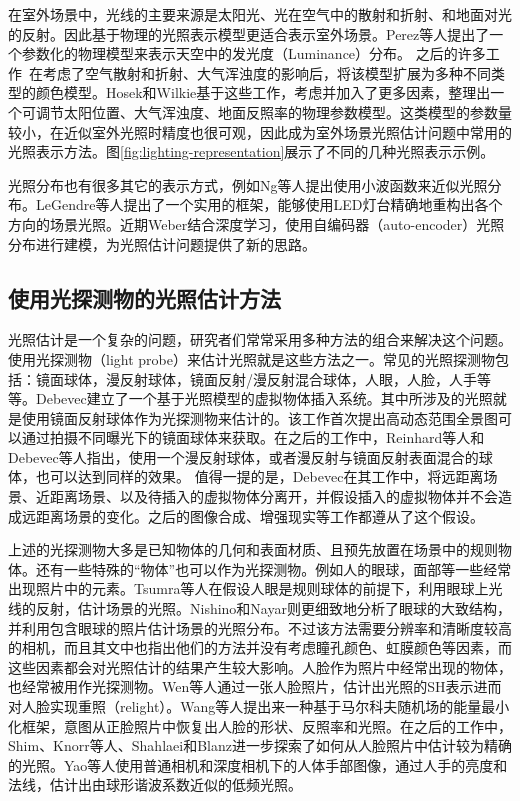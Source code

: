 在室外场景中，光线的主要来源是太阳光、光在空气中的散射和折射、和地面对光的反射。因此基于物理的光照表示模型更适合表示室外场景。Perez等人\cite{perez1993all}提出了一个参数化的物理模型来表示天空中的发光度（Luminance）分布。
之后的许多工作~\cite{nishita1996display, sirai1993display, preetham1999practical,raab2008unbiased}在考虑了空气散射和折射、大气浑浊度的影响后，将该模型扩展为多种不同类型的颜色模型。Hosek和Wilkie\cite{hosek2012analytic, hovsekhovsek2013adding}基于这些工作，考虑并加入了更多因素，整理出一个可调节太阳位置、大气浑浊度、地面反照率的物理参数模型。这类模型的参数量较小，在近似室外光照时精度也很可观，因此成为室外场景光照估计问题中常用的光照表示方法。图\ref{fig:lighting-representation}展示了不同的几种光照表示示例。

光照分布也有很多其它的表示方式，例如Ng等人\cite{ng2003all}提出使用小波函数来近似光照分布。LeGendre等人\cite{legendre2016practical}提出了一个实用的框架，能够使用LED灯台精确地重构出各个方向的场景光照。近期Weber\cite{weber2018learning}结合深度学习，使用自编码器（auto-encoder）光照分布进行建模，为光照估计问题提供了新的思路。

\subsection{使用光探测物的光照估计方法} 
光照估计是一个复杂的问题，研究者们常常采用多种方法的组合来解决这个问题。使用光探测物（light probe）来估计光照就是这些方法之一。常见的光照探测物包括：镜面球体，漫反射球体，镜面反射/漫反射混合球体，人眼，人脸，人手等等。Debevec\cite{debevec1998rendering}建立了一个基于光照模型的虚拟物体插入系统。其中所涉及的光照就是使用镜面反射球体作为光探测物来估计的。该工作首次提出高动态范围全景图可以通过拍摄不同曝光下的镜面球体来获取。在之后的工作中，Reinhard等人\cite{reinhard2005high}和Debevec等人\cite{debevec2012single}指出，使用一个漫反射球体，或者漫反射与镜面反射表面混合的球体，也可以达到同样的效果。 值得一提的是，Debevec在其工作\cite{debevec1998rendering}中，将远距离场景、近距离场景、以及待插入的虚拟物体分离开，并假设插入的虚拟物体并不会造成远距离场景的变化。之后的图像合成、增强现实等工作都遵从了这个假设。


上述的光探测物大多是已知物体的几何和表面材质、且预先放置在场景中的规则物体。还有一些特殊的“物体”也可以作为光探测物。例如人的眼球，面部等一些经常出现照片中的元素。Tsumra等人\cite{tsumura2003estimating}在假设人眼是规则球体的前提下，利用眼球上光线的反射，估计场景的光照。Nishino和Nayar\cite{nishino2004eyes}则更细致地分析了眼球的大致结构，并利用包含眼球的照片估计场景的光照分布。不过该方法需要分辨率和清晰度较高的相机，而且其文中也指出他们的方法并没有考虑瞳孔颜色、虹膜颜色等因素，而这些因素都会对光照估计的结果产生较大影响。人脸作为照片中经常出现的物体，也经常被用作光探测物。Wen等人\cite{wen2003face}通过一张人脸照片，估计出光照的SH表示进而对人脸实现重照（relight）。Wang等人\cite{wang2007face}提出来一种基于马尔科夫随机场的能量最小化框架，意图从正脸照片中恢复出人脸的形状、反照率和光照。在之后的工作中，Shim\cite{shim2012faces}、Knorr等人\cite{knorr2014real}、Shahlaei和Blanz\cite{shahlaei2015realistic}进一步探索了如何从人脸照片中估计较为精确的光照。Yao等人\cite{yao2013hand}使用普通相机和深度相机下的人体手部图像，通过人手的亮度和法线，估计出由球形谐波系数近似的低频光照。


